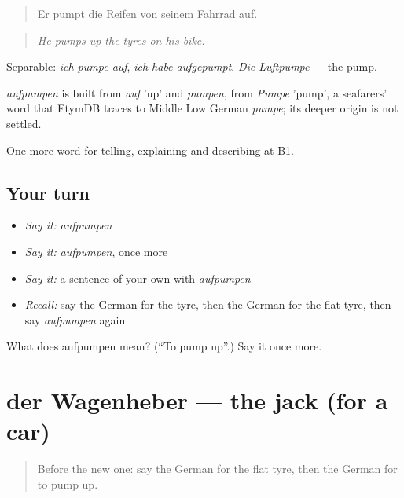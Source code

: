 \begin{quote}
Er pumpt die Reifen von seinem Fahrrad auf.
\end{quote}

\begin{quote}
\emph{He pumps up the tyres on his bike.}
\end{quote}

Separable: \emph{ich pumpe auf}, \emph{ich habe aufgepumpt}. \emph{Die Luftpumpe} — the pump.

\begin{cousinweb}
\emph{aufpumpen} is built from \emph{auf} 'up' and \emph{pumpen}, from \emph{Pumpe} 'pump', a seafarers' word that EtymDB traces to Middle Low German \emph{pumpe}; its deeper origin is not settled.
\end{cousinweb}

\begin{grammarlens}[title={What you've built}]
One more word for telling, explaining and describing at B1.
\end{grammarlens}

\subsection*{Your turn}
\begin{itemize}
\raggedright
  \item \emph{Say it:} \emph{aufpumpen}
  \item \emph{Say it:} \emph{aufpumpen}, once more
  \item \emph{Say it:} a sentence of your own with \emph{aufpumpen}
  \item \emph{Recall:} say the German for the tyre, then the German for the flat tyre, then say \emph{aufpumpen} again
\end{itemize}

\begin{tcolorbox}[breakable,colback=teal!4,colframe=teal!35!black,title={Before you move on}]
What does aufpumpen mean? (\textquotedblleft{}To pump up\textquotedblright{}.) Say it once more.
\end{tcolorbox}
\section[der Wagenheber]{der Wagenheber — the jack (for a car)}

\label{lesson:GE-C404-wagenheber}



\begin{quote}
Before the new one: say the German for the flat tyre, then the German for to pump up.
\end{quote}


